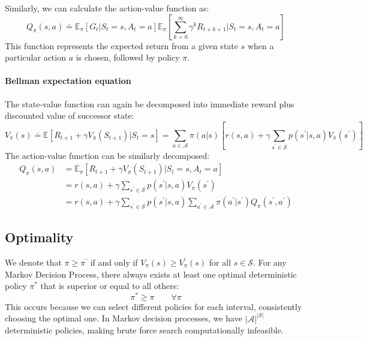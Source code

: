 Similarly, we can calculate the action-value function as:
\[Q_{\pi}(s,a)\doteq\mathbb{E}_{\pi}\left[G_t|S_t=s,A_t=a\right]\mathbb{E}_{\pi}\left[\sum_{k=0}^{\infty}\gamma^kR_{t+k+1}|S_t=s,A_t=a\right]\]
This function represents the expected return from a given state $s$ when a particular action $a$  is chosen, followed by policy $\pi$. 

\paragraph*{Bellman expectation equation}
The state-value function can again be decomposed into immediate reward plus discounted value of successor state: 
\[V_{\pi}(s) \doteq \mathbb{E}\left[R_{t+1}+\gamma V_{\pi}(S_{t+1})|S_t=s\right]=\sum_{a\in\mathcal{A}}\pi(a|s)\left[r(s,a)+\gamma\sum_{s^\prime\in\mathcal{S}}p(s^\prime|s,a)V_{\pi}(s^\prime)\right]\]
The action-value function can be similarly decomposed:
\begin{align*}
    Q_{\pi}(s,a)    &= \mathbb{E}_{\pi}\left[R_{t+1} + \gamma V_{\pi}\left(S_{t+1}\right)|S_t = s, A_t = a\right] \\
                    &= r(s,a) + \gamma \sum_{s^\prime \in \mathcal{S}} p(s^\prime | s, a) V_{\pi}(s^\prime) \\
                    &= r(s,a) + \gamma \sum_{s^\prime \in \mathcal{S}} p(s^\prime | s, a) \sum_{a^\prime \in \mathcal{A}} \pi(a^\prime | s^\prime) Q_{\pi}(s^\prime, a^\prime)
\end{align*}

\subsection{Optimality}
We denote that $\pi\geq\pi^\prime$ if and only if $V_\pi(s)\geq V_\pi^\prime(s)$ for all $s \in \mathcal{S}$. 
For any Markov Decision Process, there always exists at least one optimal deterministic policy $\pi^\ast$ that is superior or equal to all others:
\[\pi^\ast\geq\pi\qquad\forall\pi\]
This occurs because we can select different policies for each interval, consistently choosing the optimal one.
In Markov decision processes, we have $\left\lvert \mathcal{A}\right\rvert^{\left\lvert \mathcal{S}\right\rvert}$ deterministic policies, making brute force search computationally infeasible.


